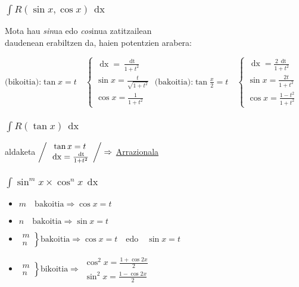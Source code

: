 \documentclass[8pt]{article}
\DeclareMathOperator{\xder}{\, \mathrm{d}x}
\DeclareMathOperator{\tder}{\, \mathrm{d}t}
\begin{document}
		\subsubsection{$\int R(\sin x, \cos x) \xder $}
			Mota hau \textit{sin}ua edo \textit{cos}inua zatitzailean\\
			daudenean erabiltzen da, haien potentzien arabera:

			$ \text{(bikoitia):} \tan x = t \quad
				\left\{
				\begin{array}{c}
					\xder = \frac{\tder}{1+{t}^{2}}\\
					\sin x = \frac{t}{\sqrt{1+{t}^{2}}}\\
					\cos x = \frac{1}{1+{t}^{2}}
				\end{array}
				\right.
			$ \quad
			$ \text{(bakoitia):} \tan \frac{x}{2} = t \quad
				\left\{
				\begin{array}{c}
					\xder = \frac{2\tder}{1+{t}^{2}}\\
					\sin x = \frac{2t}{1+{t}^{2}}\\
					\cos x = \frac{1-{t}^{2}}{1+{t}^{2}}
				\end{array}
				\right.
			$
		\subsubsection{$\int R(\tan x) \xder $}
			aldaketa
			$ \left/ \begin{array}{c}
				\tan x = t\\
				\xder = \frac{\tder}{1+{t}^{2}}
			\end{array} \right/ \Rightarrow $ \underline{Arrazionala}

		\subsubsection{$\int \sin^{m} x \times \cos^{n} x \xder$}
			\begin{itemize}
				\item $ m \quad \text{bakoitia} \Rightarrow \cos x = t $
				\item $ n \quad \text{bakoitia} \Rightarrow \sin x = t $
				\item $ 
					\left.
					\begin{array}{c}
						m\\
						n
					\end{array}  \right\} \text{bakoitia} \Rightarrow
					\cos x = t \quad \text{edo}\quad\sin x = t $
				\item $
					\left.
					\begin{array}{c}
						m\\
						n
					\end{array} \right\} \text{bikoitia} \Rightarrow
						\begin{array}{c}
							\cos^{2} x = \frac{1+\cos 2x}{2}\\
							\sin^{2} x = \frac{1-\cos 2x}{2}
						\end{array} $
			\end{itemize}
\end{document}
